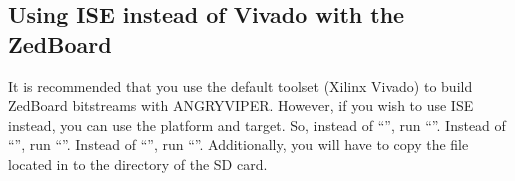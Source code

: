 \begin{appendices}
\section{Using ISE instead of Vivado with the ZedBoard}
It is recommended that you use the default toolset (Xilinx Vivado) to build ZedBoard bitstreams with ANGRYVIPER. However, if you wish to use ISE instead, you can use the  platform and  target. So, instead of ``'', run ``''. Instead of ``'', run ``''.  Instead of ``'', run ``''. Additionally, you will have to copy the  file located in  to the  directory of the SD card.

%
\end{appendices}

